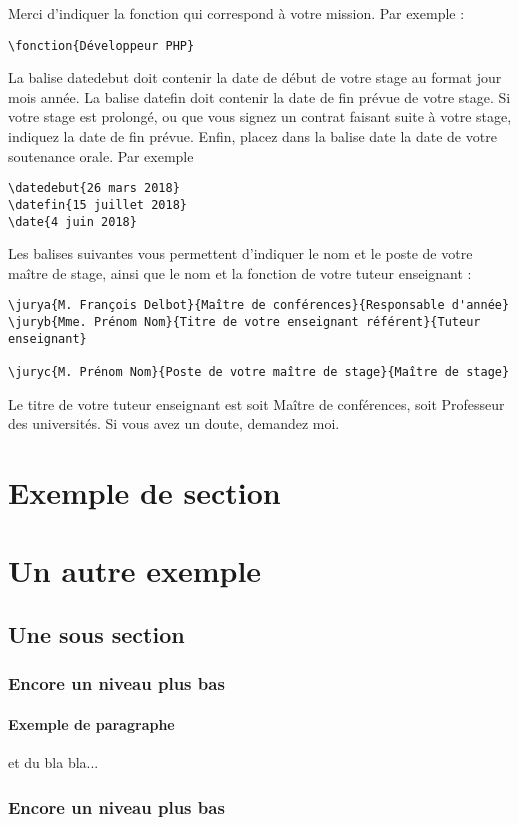 \documentclass[a4paper, 12pt, twoside]{report}
\begin{document}
Merci d'indiquer la fonction qui correspond à votre mission. Par exemple :
\begin{verbatim}
\fonction{Développeur PHP}
\end{verbatim}

La balise datedebut doit contenir la date de début de votre stage au format jour mois année. La balise datefin doit contenir la date de fin prévue de votre stage. Si votre stage est prolongé, ou que vous signez un contrat faisant suite à votre stage, indiquez la date de fin prévue. Enfin, placez dans la balise date la date de votre soutenance orale. Par exemple
\begin{verbatim}
\datedebut{26 mars 2018}
\datefin{15 juillet 2018}
\date{4 juin 2018}
\end{verbatim}

Les balises suivantes vous permettent d'indiquer le nom et le poste de votre maître de stage, ainsi que le nom et la fonction de votre tuteur enseignant :
\begin{verbatim}
\jurya{M. François Delbot}{Maître de conférences}{Responsable d'année}
\juryb{Mme. Prénom Nom}{Titre de votre enseignant référent}{Tuteur enseignant}

\juryc{M. Prénom Nom}{Poste de votre maître de stage}{Maître de stage}
\end{verbatim}
Le titre de votre tuteur enseignant est soit Maître de conférences, soit Professeur des universités. Si vous avez un doute, demandez moi. 


\section{Exemple de section}
\section{Un autre exemple}
	\subsection{Une sous section}
	\subsubsection{Encore un niveau plus bas}
	\paragraph{Exemple de paragraphe} et du bla bla...
	\subsubsection{Encore un niveau plus bas}
\end{document}
